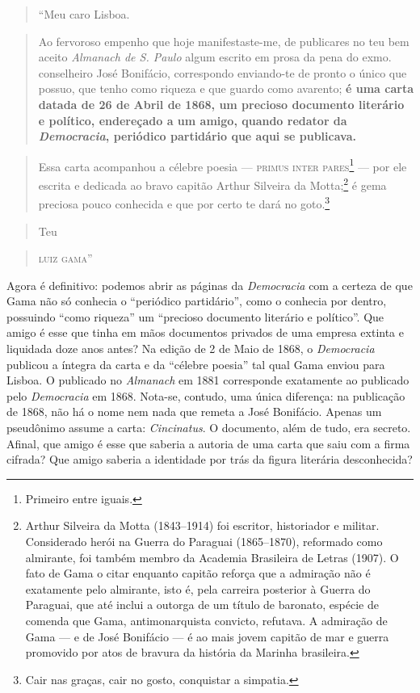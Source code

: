 \begin{quote}
``Meu caro Lisboa.
\end{quote}

\begin{quote}
Ao fervoroso empenho que hoje manifestaste-me, de publicares no teu bem
aceito \emph{Almanach de S. Paulo} algum escrito em prosa da pena do
exmo. conselheiro José Bonifácio, correspondo enviando-te de pronto o
único que possuo, que tenho como riqueza e que guardo como avarento;
\textbf{é uma carta datada de 26 de Abril de 1868, um precioso documento
literário e político, endereçado a um amigo, quando redator da
\emph{Democracia}, periódico partidário que aqui se publicava.}
\end{quote}

\begin{quote}
Essa carta acompanhou a célebre poesia --- \textsc{primus inter pares}\footnote{Primeiro entre iguais.} --- por ele escrita e dedicada ao bravo capitão
Arthur Silveira da Motta;\footnote{Arthur Silveira da Motta (1843--1914)
  foi escritor, historiador e militar. Considerado herói na Guerra do
  Paraguai (1865--1870), reformado como almirante, foi também membro da
  Academia Brasileira de Letras (1907). O fato de Gama o citar enquanto
  capitão reforça que a admiração não é exatamente pelo almirante, isto
  é, pela carreira posterior à Guerra do Paraguai, que até inclui a
  outorga de um título de baronato, espécie de comenda que Gama,
  antimonarquista convicto, refutava. A admiração de Gama --- e de José
  Bonifácio --- é ao mais jovem capitão de mar e guerra promovido por
  atos de bravura da história da Marinha brasileira.} é gema preciosa
pouco conhecida e que por certo te dará no goto.\footnote{Cair nas
  graças, cair no gosto, conquistar a simpatia.}
\end{quote}
\begin{flushright}
\begin{quote}
Teu
\end{quote}

\begin{quote}
\textsc{luiz gama}''
\end{quote}
\end{flushright}
Agora é definitivo: podemos abrir as páginas da \emph{Democracia} com a
certeza de que Gama não só conhecia o ``periódico partidário'', como o
conhecia por dentro, possuindo ``como riqueza'' um ``precioso documento
literário e político''. Que amigo é esse que tinha em mãos documentos
privados de uma empresa extinta e liquidada doze anos antes? Na edição
de 2 de Maio de 1868, o \emph{Democracia} publicou a íntegra da carta e
da ``célebre poesia'' tal qual Gama enviou para Lisboa. O publicado no
\emph{Almanach} em 1881 corresponde exatamente ao publicado pelo
\emph{Democracia} em 1868. Nota-se, contudo, uma única diferença: na
publicação de 1868, não há o nome nem nada que remeta a José Bonifácio.
Apenas um pseudônimo assume a carta: \emph{Cincinatus}. O documento,
além de tudo, era secreto. Afinal, que amigo é esse que saberia a
autoria de uma carta que saiu com a firma cifrada? Que amigo saberia a
identidade por trás da figura literária desconhecida?

